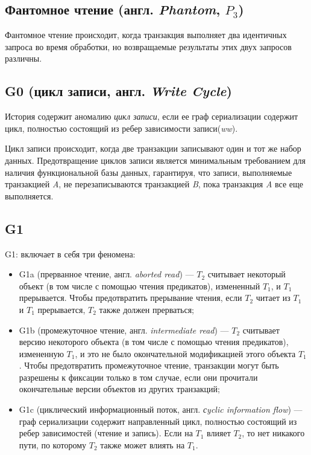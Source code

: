 \documentclass[12pt,  openany]{book}
\begin{document}
\subsection{Фантомное чтение (англ. \textit{Phantom}, $P_3$)}
Фантомное чтение происходит, когда транзакция выполняет два идентичных запроса во время обработки, но возвращаемые результаты этих двух запросов различны.  \cite{sookocheff}

\subsection{G0 (цикл записи, англ. \textit{Write Cycle})}
История содержит аномалию \textit{цикл записи}, если ее граф сериализации содержит цикл, полностью состоящий из ребер зависимости записи(\textit{ww}). 
\par Цикл записи происходит, когда две транзакции записывают один и тот же набор данных. Предотвращение циклов записи является минимальным требованием для наличия функциональной базы данных, гарантируя, что записи, выполняемые транзакцией \textit{A}, не перезаписываются транзакцией \textit{B}, пока транзакция \textit{A} все еще выполняется.  \cite{sookocheff}

\subsection{G1}
G1: включает в себя три феномена: 
\begin{itemize}
\item G1a (прерванное чтение, англ. \textit{aborted read}) --- $T_2$ считывает некоторый объект (в том числе с помощью чтения предикатов), измененный $T_1$, и $T_1$ прерывается. Чтобы предотвратить прерывание чтения, если $T_2$ читает из $T_1$ и $T_1$ прерывается, $T_2$ также должен прерваться;
\item G1b (промежуточное чтение, англ. \textit{intermediate read}) --- $T_2$ считывает версию некоторого объекта (в том числе с помощью чтения предикатов), измененную $T_1$, и это не было окончательной модификацией этого объекта $T_1$. Чтобы предотвратить промежуточное чтение, транзакции могут быть разрешены к фиксации только в том случае, если они прочитали окончательные версии объектов из других транзакций;
\item G1c (циклический информационный поток, англ. \textit{сyclic information flow}) --- граф сериализации содержит направленный цикл, полностью состоящий из ребер зависимостей (чтение и запись). Если на $T_1$ влияет $T_2$, то нет никакого пути, по которому $T_2$ также может влиять на $T_1$.
\end{itemize}
\end{document}
